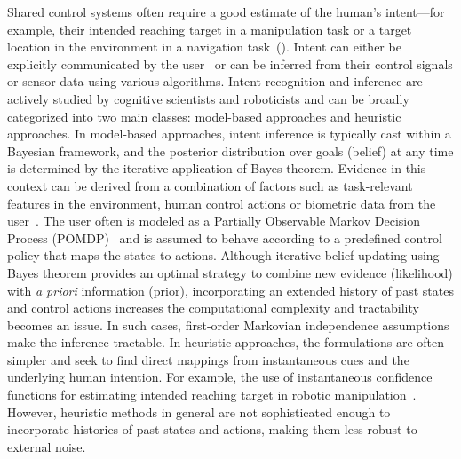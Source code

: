 Shared control systems often require a good estimate of the human's intent---for example, their intended reaching target in a manipulation task or a target location in the environment in a navigation task~(\citep{liu2016goal}). Intent can either be explicitly communicated by the user~\citep{choi2008laser} or can be inferred from their control signals or sensor data using various algorithms. Intent recognition and inference are actively studied by cognitive scientists and roboticists and can be broadly categorized into two main classes: model-based approaches and heuristic approaches. In model-based approaches, intent inference is typically cast within a Bayesian framework, and the posterior distribution over goals (belief) at any time is determined by the iterative application of Bayes theorem. Evidence in this context can be derived from a combination of factors such as task-relevant features in the environment, human control actions or biometric data from the user~\citep{baker2007goal, baker2009action}. The user often is modeled as a Partially Observable Markov Decision Process (POMDP)~\citep{taha2011pomdp} and is assumed to behave according to a predefined control policy that maps the states to actions. Although iterative belief updating using Bayes theorem provides an optimal strategy to combine new evidence (likelihood) with \textit{a priori} information (prior), incorporating an extended history of past states and control actions increases the computational complexity and tractability becomes an issue. In such cases, first-order Markovian independence assumptions make the inference tractable. In heuristic approaches, the formulations are often simpler and seek to find direct mappings from instantaneous cues and the underlying human intention. For example, the use of instantaneous confidence functions for estimating intended reaching target in robotic manipulation~\citep{dragan2012assistive, gopinath2017human}.  However, heuristic methods in general are not sophisticated enough to incorporate histories of past states and actions, making them less robust to external noise. 

